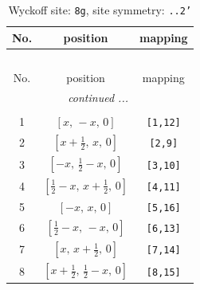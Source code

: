 \documentclass[fleqn,8pt]{jsarticle}
\begin{document}
\renewcommand{\arraystretch}{1.2}
\begin{longtable}{ccc}
\caption{Wyckoff site: {\tt 8g}, site symmetry: {\tt ..2'}}
 \\
 \hline \hline
No. & position & mapping \\ \hline \endfirsthead

\multicolumn{2}{l}{\tablename\ \thetable{}} \\
 \hline \hline
No. & position & mapping \\ \hline \endhead

 \hline \hline
\multicolumn{2}{r}{\footnotesize\it continued ...} \\ \endfoot

 \hline \hline
\multicolumn{2}{r}{} \\ \endlastfoot

1 & $\left[ x,\, - x,\, 0 \right]$ & {\tt [1,12]} \\ \hline
2 & $\left[ x + \frac{1}{2},\, x,\, 0 \right]$ & {\tt [2,9]} \\ \hline
3 & $\left[ - x,\, \frac{1}{2} - x,\, 0 \right]$ & {\tt [3,10]} \\ \hline
4 & $\left[ \frac{1}{2} - x,\, x + \frac{1}{2},\, 0 \right]$ & {\tt [4,11]} \\ \hline
5 & $\left[ - x,\, x,\, 0 \right]$ & {\tt [5,16]} \\ \hline
6 & $\left[ \frac{1}{2} - x,\, - x,\, 0 \right]$ & {\tt [6,13]} \\ \hline
7 & $\left[ x,\, x + \frac{1}{2},\, 0 \right]$ & {\tt [7,14]} \\ \hline
8 & $\left[ x + \frac{1}{2},\, \frac{1}{2} - x,\, 0 \right]$ & {\tt [8,15]} \\
\end{longtable}
\renewcommand{\arraystretch}{1.2}
\end{document}
